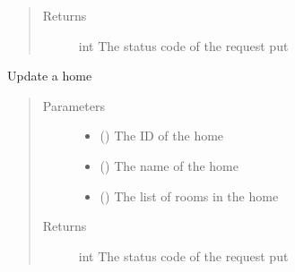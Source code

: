 \documentclass[letterpaper,10pt,english]{sphinxmanual}
\begin{document}
\begin{fulllineitems}
\begin{fulllineitems}
\begin{quote}
\begin{description}
\item[{Returns}] \leavevmode
\sphinxAtStartPar
int \textendash{} The status code of the request put

\end{description}\end{quote}

\end{fulllineitems}


\begin{fulllineitems}
\label{\detokenize{index:Api.Api.update_home}}
\sphinxAtStartPar
Update a home
\begin{quote}\begin{description}
\item[{Parameters}] \leavevmode\begin{itemize}
\item {} 
\sphinxAtStartPar
{} () \textendash{} The ID of the home

\item {} 
\sphinxAtStartPar
{} () \textendash{} The name of the home

\item {} 
\sphinxAtStartPar
{} () \textendash{} The list of rooms in the home

\end{itemize}

\item[{Returns}] \leavevmode
\sphinxAtStartPar
int \textendash{} The status code of the request put

\end{description}\end{quote}

\end{fulllineitems}



\end{fulllineitems}
\end{document}
